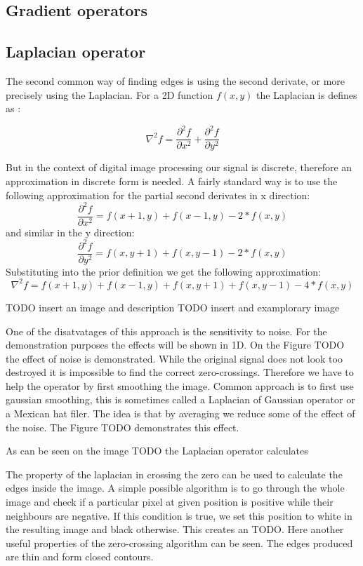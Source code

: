 \documentclass[
  digital,     %
  oneside,     %
  nosansbold,  %
  nocolorbold, %
  lof,         %
  lot,         %
]{fithesis4}
\begin{document}

\subsection{Gradient operators}

\subsection{Laplacian operator}

The second common way of finding edges is using the second derivate, or more precisely
using the Laplacian. For a 2D function $f(x, y)$ the Laplacian is defines as
\parencite{gonzalez2002}:

$$\nabla^2 f = \frac{\partial^2 f}{\partial x^2} + \frac{\partial^2 f}{\partial y^2}$$

But in the context of digital image processing our signal is discrete, therefore
an approximation in discrete form is needed. A fairly standard way is to use the
following approximation for the partial second derivates in x direction: 
$$\frac{\partial^2 f}{\partial x^2} = f(x + 1, y) + f(x - 1, y) - 2*f(x, y)$$
and similar in the y direction:
$$\frac{\partial^2 f}{\partial y^2} = f(x, y + 1) + f(x, y - 1) - 2*f(x, y)$$
Substituting into the prior definition we get the following approximation:
$$\nabla^2 f = f(x+1, y) + f(x-1, y) + f(x, y+1) + f(x, y-1) - 4*f(x,y)$$

TODO insert an image and description
TODO insert and examplorary image

One of the disatvatages of this approach is the sensitivity to noise. For the
demonstration purposes the effects will be shown in 1D. On the
Figure TODO the effect of noise is demonstrated. While the original signal does
not look too destroyed it is impossible to find the correct zero-crossings.
Therefore we have to help the operator by first smoothing the image. Common
approach is to first use gaussian smoothing, this is sometimes called a
Laplacian of Gaussian operator or a Mexican hat filer. The idea is that by
averaging we reduce some of the effect of the noise. The Figure TODO
demonstrates this effect.

As can be seen on the image TODO the Laplacian operator calculates 

The property of the laplacian in crossing the zero can be used to calculate the
edges inside the image. A simple possible algorithm is to go through the whole
image and check if a particular pixel at given position is positive while their
neighbours are negative. If this condition is true, we set this position to
white in the resulting image and black otherwise. This creates an TODO. Here
another useful properties of the zero-crossing algorithm can be seen. The edges
produced are thin and form closed contours.
\end{document}
